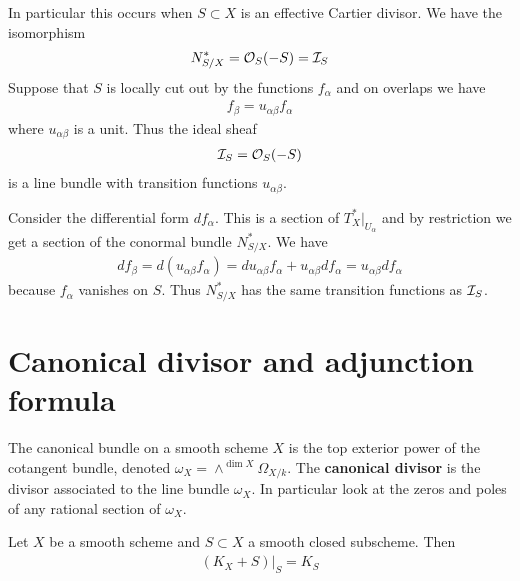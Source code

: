 \documentclass[12pt]{article}
\begin{document}
\begin{example}
    In particular this occurs when $S\subset X$ is an effective Cartier divisor. We have the isomorphism \begin{align*}
        N_{S/X}^* = {\mathcal{O}}_S(-S) = {\mathcal{I}}_S
    \end{align*} Suppose that $S$ is locally cut out by the functions $f_\alpha$ and on overlaps we have \begin{align*}
        f_\beta = u_{\alpha\beta}f_\alpha
    \end{align*} where $u_{\alpha\beta}$ is a unit. Thus the ideal sheaf \begin{align*}
        {\mathcal{I}}_S = {\mathcal{O}}_S(-S) 
    \end{align*} is a line bundle with transition functions $u_{\alpha\beta}$.

    \hfill

    Consider the differential form $df_\alpha$. This is a section of $T_X^*\vert_{U_\alpha}$ and by restriction we get 
    a section of the conormal bundle $N_{S/X}^*$. We have \begin{align*}
        df_\beta = d(u_{\alpha\beta}f_\alpha) = du_{\alpha\beta} f_\alpha + u_{\alpha\beta}df_\alpha = 
        u_{\alpha\beta}df_\alpha
    \end{align*} because $f_\alpha$ vanishes on $S$. Thus $N_{S/X}^*$ has the same transition functions as ${\mathcal{I}}_S$.
\end{example}

\section{Canonical divisor and adjunction formula}

\begin{definition}
    The canonical bundle on a smooth scheme $X$ is the top exterior power of the cotangent bundle, denoted $\omega_X = \wedge^{\dim X}\Omega_{X/k}$. The \textbf{canonical divisor} is the divisor associated to the line bundle $\omega_X$. In particular look at the zeros and poles of 
    any rational section of $\omega_X$.
\end{definition}

\begin{theorem}
     Let $X$ be a smooth scheme and $S\subset X$ a smooth closed subscheme. Then \begin{align*}
        (K_X + S)\vert_S = K_S
    \end{align*}
\end{theorem}
\end{document}
